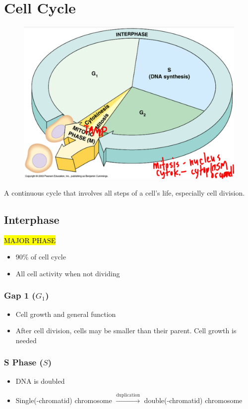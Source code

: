 \documentclass[a4paper,12pt]{article}
\begin{document}
\section{Cell Cycle}
\begin{figure}[H] \includegraphics[width=\textwidth]{cellcycle} \end{figure}

A continuous cycle that involves all steps of a cell's life, especially cell division.

\subsection{Interphase}

\hl{MAJOR PHASE}

\begin{itemize}
    \item{90\% of cell cycle}
    \item{All cell activity when not dividing}
\end{itemize}

\subsubsection{Gap 1 ($G_1$)}
\begin{itemize}
    \item{Cell growth and general function}
    \item{After cell division, cells may be smaller than their parent. Cell growth is needed}
\end{itemize}

\subsubsection{S Phase ($S$)}
\begin{itemize}
    \item{DNA is doubled}
    \item{Single(-chromatid) chromosome $\xrightarrow{\textrm{duplication}}$ double(-chromatid) chromosome}
\end{itemize}
\end{document}
